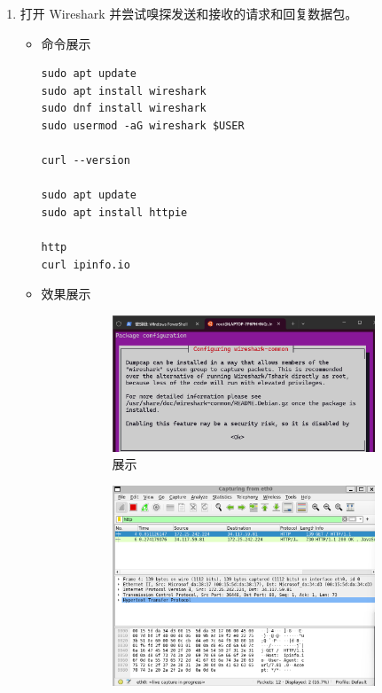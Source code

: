 \documentclass[UTF8]{ctexart}
\begin{document}
\begin{enumerate}
  \item 打开 Wireshark 并尝试嗅探发送和接收的请求和回复数据包。
  \begin{itemize}
  \item 命令展示
  \begin{verbatim}
sudo apt update
sudo apt install wireshark
sudo dnf install wireshark
sudo usermod -aG wireshark $USER

curl --version

sudo apt update
sudo apt install httpie

http
curl ipinfo.io

  \end{verbatim}
\item 效果展示
 \begin{figure}[H]
    \centering
    \begin{subfigure}[t]{0.32\textwidth}
        \centering
        \includegraphics[width=\textwidth]{151} %
        \caption{展示}
    \end{subfigure}%
    \hfill
    \begin{subfigure}[t]{0.32\textwidth}
        \centering
        \includegraphics[width=\textwidth]{152} %

\end{subfigure}
\end{figure}
\end{itemize}
\end{enumerate}
\end{document}
